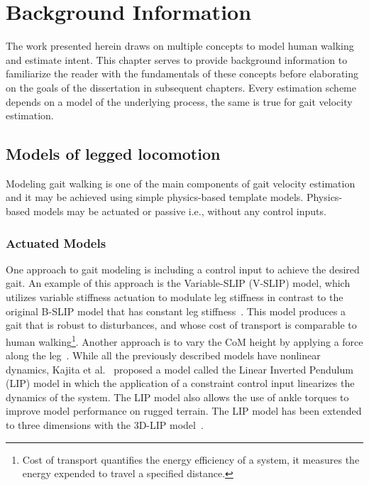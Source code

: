\chapter{Background Information}

The work presented herein draws on multiple concepts to model human walking and estimate intent. This chapter serves to provide background information to familiarize the reader with the fundamentals of these concepts before elaborating on the goals of the dissertation in subsequent chapters. Every estimation scheme depends on a model of the underlying process, the same is true for gait velocity estimation.

\section{Models of legged locomotion}

Modeling gait walking is one of the main components of gait velocity estimation and it may be achieved using simple physics-based template models. Physics-based models may be actuated or passive i.e., without any control inputs.  

\subsection{Actuated Models}

One approach to gait modeling is including a control input to achieve the desired gait. An example of this approach is the Variable-SLIP (V-SLIP) model, which utilizes variable stiffness actuation to modulate leg stiffness in contrast to the original B-SLIP model that has constant leg stiffness~\cite{visser2017bipedal}. This model produces a gait that is robust to disturbances, and whose cost of transport is comparable to human walking\footnote{Cost of transport quantifies the energy efficiency of a system, it measures the energy expended to travel a specified distance.}. Another approach is to vary the CoM height by applying a force along the leg~\cite{koolen2016balance}. While all the previously described models have nonlinear dynamics, Kajita et al.~\cite{kajita1991study} proposed a model called the Linear Inverted Pendulum (LIP) model in which the application of a constraint control input linearizes the dynamics of the system. The LIP model also allows the use of ankle torques to improve model performance on rugged terrain. The LIP model has been extended to three dimensions with the 3D-LIP model~\cite{kajita20013d}.

